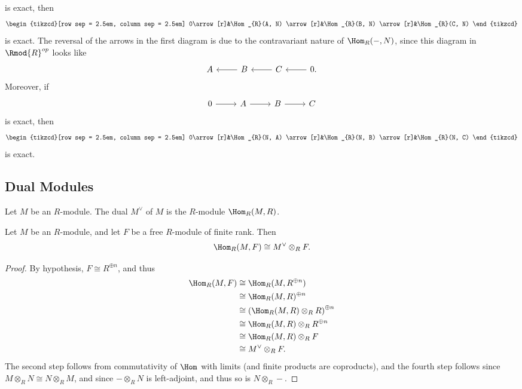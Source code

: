 is exact, then
\[\begin{tikzcd}[row sep = 2.5em, column sep = 2.5em]
	0\arrow[r]&\Hom_{R}(A, N) \arrow[r]&\Hom_{R}(B, N) \arrow[r]&\Hom_{R}(C, N) 
\end{tikzcd}\]
is exact. The reversal of the arrows in the first diagram is due to the contravariant nature of $\Hom_{R}(-, N) $, since this diagram in $\Rmod{R} ^{op} $ looks like
\[\begin{tikzcd}[row sep = 2.5em, column sep = 2.5em]
	A&B\arrow[l]&C\arrow[l]&0\arrow[l].
\end{tikzcd}\]
Moreover, if
\[\begin{tikzcd}[row sep = 2.5em, column sep = 2.5em]
	0\arrow[r]&A\arrow[r]&B\arrow[r]&C
\end{tikzcd}\]
is exact, then
\[\begin{tikzcd}[row sep = 2.5em, column sep = 2.5em]
	0\arrow[r]&\Hom_{R}(N, A) \arrow[r]&\Hom_{R}(N, B) \arrow[r]&\Hom_{R}(N, C) 
\end{tikzcd}\]
is exact.
\subsection{Dual Modules}
\begin{definition}\label{dfn:8.20}
	Let $M$ be an $R$-module. The dual $M^{\vee} $ of $M$ is the $R$-module $\Hom_{R}(M, R) $.
\end{definition}
\begin{proposition}\label{prp:8.6}
	Let $M$ be an $R$-module, and let $F$ be a free $R$-module of finite rank. Then
	\[
		\Hom_{R}(M, F) \cong M^{\vee} \otimes _RF
	.\]
\end{proposition}
\begin{proof}
	By hypothesis, $F\cong R^{\oplus n} $, and thus
	\begin{align*}
		\Hom_{R}(M, F) &\cong \Hom_{R}(M, R^{\oplus n} ) \\
			       &\cong \Hom_{R}(M, R) ^{\oplus n} \\
			       &\cong \left( \Hom_{R}(M, R) \otimes_R R \right) ^{\oplus n} \\
			       &\cong \Hom_{R}(M, R) \otimes_R R^{\oplus n} \\
			       &\cong \Hom_{R}(M, R) \otimes_R F\\
			       &\cong M^{\vee} \otimes_R F
	.\end{align*}
	The second step follows from commutativity of $\Hom$ with limits (and finite products are coproducts), and the fourth step follows since $M\otimes_R N\cong N\otimes_R M$, and since $-\otimes_R N$ is left-adjoint, and thus so is $N\otimes_R -$.
\end{proof}

